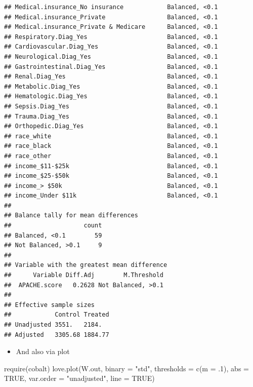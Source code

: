 \documentclass[
]{book}
\newenvironment{Shaded}{\begin{snugshade}}{\end{snugshade}}
\newcommand{\AttributeTok}[1]{\textcolor[rgb]{0.77,0.63,0.00}{#1}}
\newcommand{\ConstantTok}[1]{\textcolor[rgb]{0.00,0.00,0.00}{#1}}
\newcommand{\DecValTok}[1]{\textcolor[rgb]{0.00,0.00,0.81}{#1}}
\newcommand{\FunctionTok}[1]{\textcolor[rgb]{0.00,0.00,0.00}{#1}}
\newcommand{\NormalTok}[1]{#1}
\newcommand{\StringTok}[1]{\textcolor[rgb]{0.31,0.60,0.02}{#1}}
\providecommand{\tightlist}{%
  \setlength{\itemsep}{0pt}\setlength{\parskip}{0pt}}
\begin{document}
\begin{verbatim}
## Medical.insurance_No insurance            Balanced, <0.1
## Medical.insurance_Private                 Balanced, <0.1
## Medical.insurance_Private & Medicare      Balanced, <0.1
## Respiratory.Diag_Yes                      Balanced, <0.1
## Cardiovascular.Diag_Yes                   Balanced, <0.1
## Neurological.Diag_Yes                     Balanced, <0.1
## Gastrointestinal.Diag_Yes                 Balanced, <0.1
## Renal.Diag_Yes                            Balanced, <0.1
## Metabolic.Diag_Yes                        Balanced, <0.1
## Hematologic.Diag_Yes                      Balanced, <0.1
## Sepsis.Diag_Yes                           Balanced, <0.1
## Trauma.Diag_Yes                           Balanced, <0.1
## Orthopedic.Diag_Yes                       Balanced, <0.1
## race_white                                Balanced, <0.1
## race_black                                Balanced, <0.1
## race_other                                Balanced, <0.1
## income_$11-$25k                           Balanced, <0.1
## income_$25-$50k                           Balanced, <0.1
## income_> $50k                             Balanced, <0.1
## income_Under $11k                         Balanced, <0.1
## 
## Balance tally for mean differences
##                    count
## Balanced, <0.1        59
## Not Balanced, >0.1     9
## 
## Variable with the greatest mean difference
##      Variable Diff.Adj        M.Threshold
##  APACHE.score   0.2628 Not Balanced, >0.1
## 
## Effective sample sizes
##            Control Treated
## Unadjusted 3551.   2184.  
## Adjusted   3305.68 1884.77
\end{verbatim}

\begin{itemize}
\tightlist
\item
  And also via plot
\end{itemize}

\begin{Shaded}
\begin{Highlighting}[]
\FunctionTok{require}\NormalTok{(cobalt)}
\FunctionTok{love.plot}\NormalTok{(W.out, }\AttributeTok{binary =} \StringTok{"std"}\NormalTok{,}
          \AttributeTok{thresholds =} \FunctionTok{c}\NormalTok{(}\AttributeTok{m =}\NormalTok{ .}\DecValTok{1}\NormalTok{),}
          \AttributeTok{abs =} \ConstantTok{TRUE}\NormalTok{, }
          \AttributeTok{var.order =} \StringTok{"unadjusted"}\NormalTok{, }
          \AttributeTok{line =} \ConstantTok{TRUE}\NormalTok{)}
\end{Highlighting}
\end{Shaded}
\end{document}
